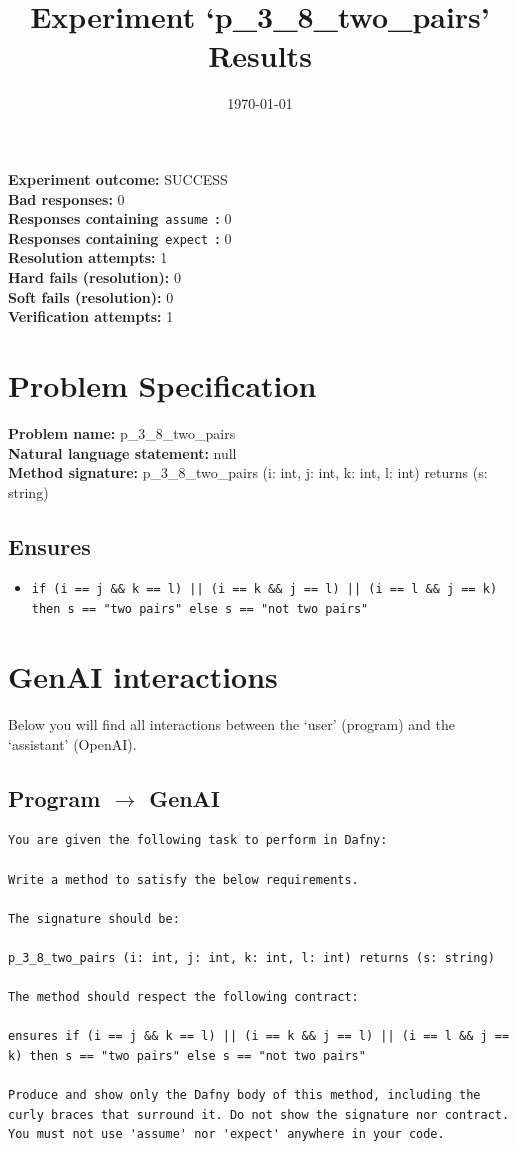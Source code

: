 \documentclass{article}
\begin{document}
\title{Experiment `p\_3\_8\_two\_pairs' Results}
\author{\today}
\date{}
\maketitle
\textbf{Experiment outcome: }SUCCESS
\\\textbf{Bad responses: }0
\\\textbf{Responses containing}~\texttt{assume}~\textbf{: }0
\\\textbf{Responses containing}~\texttt{expect}~\textbf{: }0
\\\textbf{Resolution attempts: }1
\\\textbf{Hard fails (resolution): }0
\\\textbf{Soft fails (resolution): }0
\\\textbf{Verification attempts: }1
\section*{Problem Specification}
\textbf{Problem name: }p\_3\_8\_two\_pairs
\\\textbf{Natural language statement: }null
\\\textbf{Method signature: }p\_3\_8\_two\_pairs (i: int, j: int, k: int, l: int) returns (s: string)
\subsection*{Ensures}
\begin{itemize}
\item \texttt{if (i == j \&\& k == l) || (i == k \&\& j == l) || (i == l \&\& j == k) then s == "two pairs" else s == "not two pairs"}
\end{itemize}
\clearpage
\section*{GenAI interactions}
Below you will find all interactions between the `user' (program) and the `assistant' (OpenAI).
\subsection*{Program $\rightarrow$ GenAI}
\begin{lstlisting}
You are given the following task to perform in Dafny:

Write a method to satisfy the below requirements.

The signature should be:

p_3_8_two_pairs (i: int, j: int, k: int, l: int) returns (s: string)

The method should respect the following contract:

ensures if (i == j && k == l) || (i == k && j == l) || (i == l && j == k) then s == "two pairs" else s == "not two pairs"

Produce and show only the Dafny body of this method, including the curly braces that surround it. Do not show the signature nor contract. You must not use 'assume' nor 'expect' anywhere in your code.
\end{lstlisting}
\end{document}
